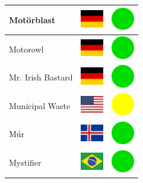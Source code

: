 \documentclass[12pt, a4paper, twoside]{report}
\begin{document}
\begin{center}
\begin{longtable}{|p{5cm}|p{2cm}|p{2cm}|}
Motörblast & \includegraphics[width=1cm]{4x3/de} & \includegraphics[width=1cm]{likes/y} \\ \hline
Motorowl & \includegraphics[width=1cm]{4x3/de} & \includegraphics[width=1cm]{likes/y} \\ \hline
Mr. Irish Bastard & \includegraphics[width=1cm]{4x3/de} & \includegraphics[width=1cm]{likes/y} \\ \hline
Municipal Waste & \includegraphics[width=1cm]{4x3/us} & \includegraphics[width=1cm]{likes/m} \\ \hline
Múr & \includegraphics[width=1cm]{4x3/is} & \includegraphics[width=1cm]{likes/y} \\ \hline
Mystifier & \includegraphics[width=1cm]{4x3/br} & \includegraphics[width=1cm]{likes/y} \\ \hline

\end{longtable}
\end{center}
\end{document}
